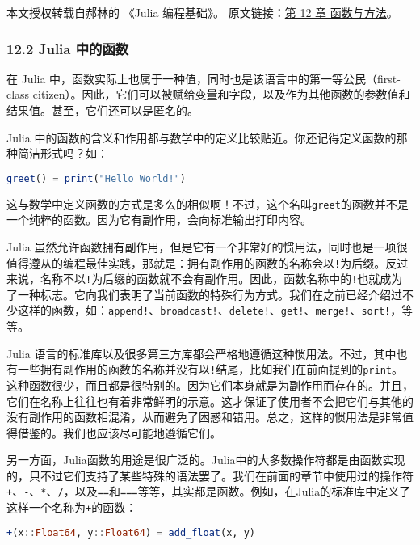 
本文授权转载自郝林的 《Julia 编程基础》。 原文链接：\href{https://github.com/hyper0x/JuliaBasics/blob/master/book/ch12.md}{第 12 章 函数与方法}。

\subsubsection{12.2 Julia 中的函数}

在 Julia 中，函数实际上也属于一种值，同时也是该语言中的第一等公民（first-class citizen）。因此，它们可以被赋给变量和字段，以及作为其他函数的参数值和结果值。甚至，它们还可以是匿名的。

Julia 中的函数的含义和作用都与数学中的定义比较贴近。你还记得定义函数的那种简洁形式吗？如：

\begin{lstlisting}[language=julia]
greet() = print("Hello World!")
\end{lstlisting}

这与数学中定义函数的方式是多么的相似啊！不过，这个名叫\verb|greet|的函数并不是一个纯粹的函数。因为它有副作用，会向标准输出打印内容。

Julia 虽然允许函数拥有副作用，但是它有一个非常好的惯用法，同时也是一项很值得遵从的编程最佳实践，那就是：拥有副作用的函数的名称会以\verb|!|为后缀。反过来说，名称不以\verb|!|为后缀的函数就不会有副作用。因此，函数名称中的\verb|!|也就成为了一种标志。它向我们表明了当前函数的特殊行为方式。我们在之前已经介绍过不少这样的函数，如：\verb|append!|、\verb|broadcast!|、\verb|delete!|、\verb|get!|、\verb|merge!|、\verb|sort!|，等等。

Julia 语言的标准库以及很多第三方库都会严格地遵循这种惯用法。不过，其中也有一些拥有副作用的函数的名称并没有以\verb|!|结尾，比如我们在前面提到的\verb|print|。这种函数很少，而且都是很特别的。因为它们本身就是为副作用而存在的。并且，它们在名称上往往也有着非常鲜明的示意。这才保证了使用者不会把它们与其他的没有副作用的函数相混淆，从而避免了困惑和错用。总之，这样的惯用法是非常值得借鉴的。我们也应该尽可能地遵循它们。

另一方面，Julia函数的用途是很广泛的。Julia中的大多数操作符都是由函数实现的，只不过它们支持了某些特殊的语法罢了。我们在前面的章节中使用过的操作符\verb|+|、\verb|-|、\verb|*|、\verb|/|，以及\verb|==|和\verb|===|等等，其实都是函数。例如，在Julia的标准库中定义了这样一个名称为\verb|+|的函数：

\begin{lstlisting}[language=julia]
+(x::Float64, y::Float64) = add_float(x, y)
\end{lstlisting}

